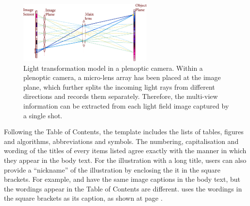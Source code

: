 \begin{figure}[t]
    \centering
    \includegraphics[width=0.6\textwidth]{Figures/Chapter2/photo_consistency.pdf}
    \caption[Light transformation model (focused on the plane).]{Light transformation model in a plenoptic camera. Within a plenoptic camera, a micro-lens array has been placed at the image plane, which further splits the incoming light rays from different directions and records them separately. Therefore, the multi-view information can be extracted from each light field image captured by a single shot.}
    \label{fig:photo_consistency_with_nickname}
\end{figure}
Following the Table of Contents, the template includes the lists of tables, figures and algorithms, abbreviations and symbols. The numbering, capitalisation and wording of the titles of every items listed agree exactly with the manner in which they appear in the body text. For the illustration with a long title, users can also provide a ``nickname'' of the illustration by enclosing the it in the square brackets. For example,  and  have the same image captions in the body text, but the wordings appear in the Table of Contents are different.  uses the wordings in the square brackets as its caption, as shown at page .
